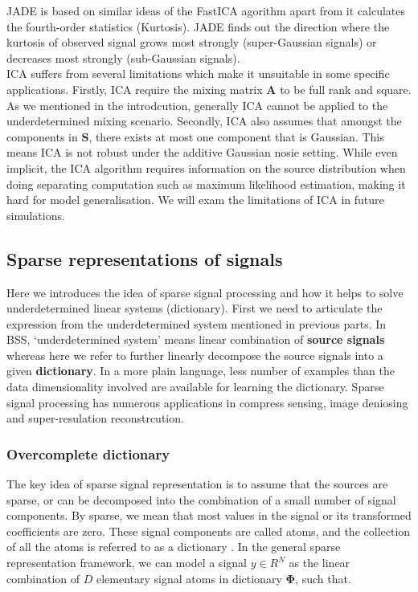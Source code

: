 JADE is based on similar ideas of the FastICA agorithm apart from it calculates the fourth-order statistics (Kurtosis). JADE finds out the direction where the kurtosis of observed signal grows most strongly (super-Gaussian signals) or decreases most strongly (sub-Gaussian signals).\\

\label{ica_defect}
ICA suffers from several limitations which make it unsuitable in some specific applications. Firstly, ICA require the mixing matrix $\mathbf{A}$ to be full rank and square. As we mentioned in the introdcution, generally ICA cannot be applied to the underdetermined mixing scenario. Secondly, ICA also assumes that amongst the components in $\mathbf{S}$, there exists at most one component that is Gaussian. This means ICA is not robust under the additive Gaussian nosie setting. While even implicit, the ICA algorithm requires information on the source distribution when doing separating computation such as maximum likelihood estimation, making it hard for model generalisation. We will exam the limitations of ICA in future simulations.

\subsection{Sparse representations of signals}
Here we introduces the idea of sparse signal processing and how it helps to solve underdetermined linear systems (dictionary). First we need to articulate the expression from the underdetermined system mentioned in previous parts. In BSS, `underdetermined system' means linear combination of \textbf{source signals} whereas here we refer to further linearly decompose the source signals into a given \textbf{dictionary}. In a more plain language, less number of examples than the data dimensionality involved are available for learning the dictionary. Sparse signal processing has numerous applications in compress sensing, image deniosing and super-resulation reconstrcution.

\subsubsection{Overcomplete dictionary}
\label{over_dict}
The key idea of sparse signal representation is to assume
that the sources are sparse, or can be decomposed into the
combination of a small number of signal components. By
sparse, we mean that most values in the signal or its transformed coefficients are zero. These signal components are called atoms, and the collection of all the atoms is referred to as a dictionary \cite{Mallat_Zhang1993}. In the general sparse representation framework, we can model a signal $y \in R^N$ as the linear combination of $D$ elementary signal atoms in dictionary $\mathbf{\Phi}$, such that.

